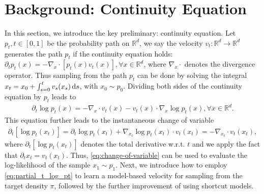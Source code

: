 \section{Background: Continuity Equation}
In this section, we introduce the key preliminary: continuity equation. Let $p_t, t \in [0,1]$ be the probability path on $\mathbb{R}^d$, we say the velocity $v_t: \mathbb{R}^d \rightarrow \mathbb{R}^d$ generates the path $p_t$ if the continuity equation holds: $\partial_t p_t (x) = -\nabla_x \cdot [p_t(x) v_t(x)], \forall x \in \mathbb{R}^d$, where $\nabla_x \cdot$ denotes the divergence operator. Thus sampling from the path $p_t$ can be done by solving the integral $x_t = x_0 + \int_{s=0}^t v_s (x_s) \mathop{}\!\mathrm{d} s$, with $x_0 \sim p_0$. Dividing both sides of the continuity equation by $p_t$ leads to 
\begin{align} \label{eq:partial_t_log_pt}
    \partial_t \log p_t (x) = - \nabla_x \cdot v_t (x) - v_t (x) \cdot \nabla_x \log p_t (x), \forall x \in \mathbb{R}^d.
\end{align}
This equation further leads to the instantaneous change of variable
\begin{align} \label{eq:change-of-variable}
    \partial_t [\log p_t(x_t)] = \partial_t \log p_t (x_t) + \nabla_{x_t} \log p_t (x_t) \cdot v_t (x_t) = - \nabla_{x_t} \cdot v_t (x_t),
\end{align}
where $\partial_t [\log p_t(x_t)]$ denotes the total derivative w.r.t. $t$ and we apply the fact that $\partial_t x_t = v_t (x_t)$. Thus, \cref{eq:change-of-variable} can be used to evaluate the log-likelihood of the sample $x_1 \sim p_1$. Next, we introduce how to employ \cref{eq:partial_t_log_pt} to learn a model-based velocity for sampling from the target density $\pi$, followed by the further improvement of using shortcut models.